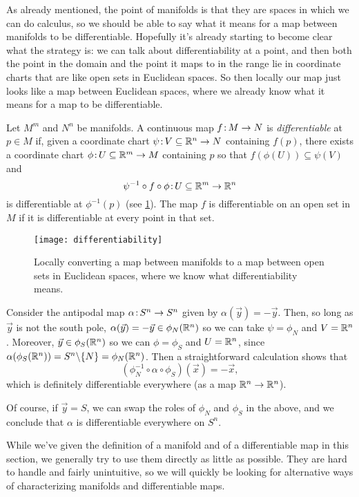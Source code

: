 As already mentioned, the point of manifolds is that they are spaces in which we can do calculus, so we should be able to say what it means for a map between manifolds to be differentiable. Hopefully it's already starting to become clear what the strategy is: we can talk about differentiability at a point, and then both the point in the domain and the point it maps to in the range lie in coordinate charts that are like open sets in Euclidean spaces. So then locally our map just looks like a map between Euclidean spaces, where we already know what it means for a map to be differentiable.

\begin{definition}\label{def:differentiable}
	Let $M^m$ and $N^n$ be manifolds. A continuous map $f\colon\thinspace\!\! M \to N$ is \emph{differentiable} at $p \in M$ if, given a coordinate chart $\psi\colon\thinspace\!\! V \subseteq \mathbb{R}^n \to N$ containing $f(p)$, there exists a coordinate chart $\phi\colon\thinspace\!\! U \subseteq \mathbb{R}^m \to M$ containing $p$ so that $f(\phi(U)) \subseteq \psi(V)$ and 
	\[
		\psi^{-1} \circ f \circ \phi\colon\thinspace\!\! U \subseteq \mathbb{R}^m \to \mathbb{R}^n
	\]
	is differentiable at $\phi^{-1}(p)$ (see \cref{fig:differentiable}). The map $f$ is differentiable on an open set in $M$ if it is differentiable at every point in that set.
\end{definition}

\begin{figure}[htbp]
	\centering
		\texttt{[image: differentiability]}
	\caption{Locally converting a map between manifolds to a map between open sets in Euclidean spaces, where we know what differentiability means.}
	\label{fig:differentiable}
\end{figure}


\begin{example}
	Consider the antipodal map $\alpha \colon\thinspace\!\! S^n \to S^n$ given by $\alpha(\vec{y}) = -\vec{y}$. Then, so long as $\vec{y}$ is not the south pole, $\alpha(\vec{y}) = -\vec{y} \in \phi_N(\mathbb{R}^n)$ so we can take $\psi = \phi_N$ and $V = \mathbb{R}^n$. Moreover, $\vec{y} \in \phi_S(\mathbb{R}^n)$ so we can $\phi = \phi_S$ and $U = \mathbb{R}^n$, since $\alpha(\phi_S(\mathbb{R}^n)) = S^n \backslash\{N\} = \phi_N(\mathbb{R}^n)$. Then a straightforward calculation shows that
	\[
		(\phi_N^{-1} \circ \alpha \circ \phi_S)(\vec{x}) = -\vec{x},
	\]
	which is definitely differentiable everywhere (as a map $\mathbb{R}^n \to \mathbb{R}^n$). 
	
	Of course, if $\vec{y} = S$, we can swap the roles of $\phi_N$ and $\phi_S$ in the above, and we conclude that $\alpha$ is differentiable everywhere on $S^n$.
\end{example}

While we've given the definition of a manifold and of a differentiable map in this section, we generally try to use them directly as little as possible. They are hard to handle and fairly unintuitive, so we will quickly be looking for alternative ways of characterizing manifolds and differentiable maps.
